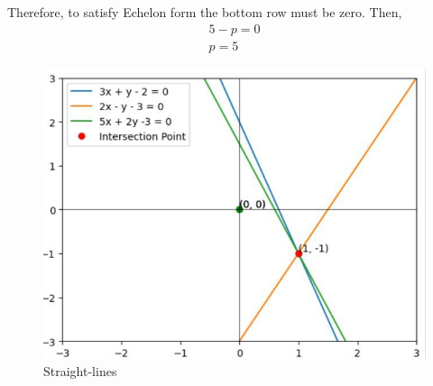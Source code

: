 \documentclass[12pt]{article}
\begin{document}
Therefore, to satisfy Echelon form the bottom row must be zero. Then,
\begin{align}
	5-p = 0 \\
	p = 5
\end{align}
\begin{figure}[H]
	\centering
	\includegraphics[width=\columnwidth]{figs/graph.jpg}
	\caption{Straight-lines}
	\label{fig:st.lines}
\end{figure}
\end{document}
